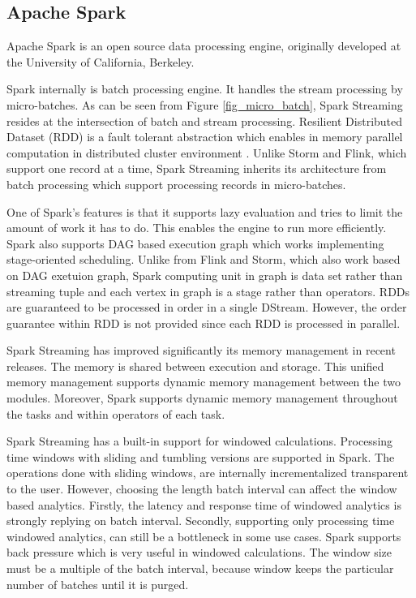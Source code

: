 \subsection{Apache Spark}
Apache Spark is an open source data processing engine, originally developed at the University of California, Berkeley. 

Spark internally is batch processing engine. It handles the stream processing by micro-batches. As can be seen from Figure \ref{fig_micro_batch},  Spark Streaming resides at the intersection of batch and stream processing.  Resilient Distributed Dataset (RDD) is a fault tolerant abstraction which enables in memory parallel computation in  distributed cluster environment \cite{zaharia2012resilient}. Unlike Storm and Flink, which support one record at a time, Spark Streaming inherits its architecture from batch processing which support processing records in micro-batches. 

One of Spark's features is that it supports lazy evaluation and tries to  limit the amount of work it has to do. This enables the engine to run more efficiently. Spark also supports DAG based execution graph which works implementing  stage-oriented scheduling. Unlike from Flink and Storm, which also work based on DAG exetuion graph, Spark computing unit in graph is data set rather than streaming tuple and each vertex in graph is a stage rather than operators. RDDs are guaranteed to be processed in order in a single DStream. However, the order guarantee within RDD is not provided since each RDD is processed in parallel. 

Spark Streaming has improved significantly its memory management in recent releases.  The memory is shared between execution and storage. This unified memory management supports dynamic memory management between the two modules. Moreover, Spark supports dynamic memory management throughout the tasks and within operators of each task. 

Spark Streaming has a built-in support for windowed calculations. Processing time windows with sliding and tumbling versions are  supported in Spark. The operations done with sliding windows, are internally incrementalized transparent to the user.  However, choosing the length batch interval can affect the window based analytics. Firstly, the latency and response time of windowed analytics is strongly replying on batch interval. Secondly, supporting only processing time windowed analytics, can still be a bottleneck in some use cases. Spark supports back pressure which is very useful in windowed calculations. The window size must be a multiple of the batch interval, because window keeps the particular number of batches until it is purged. 




